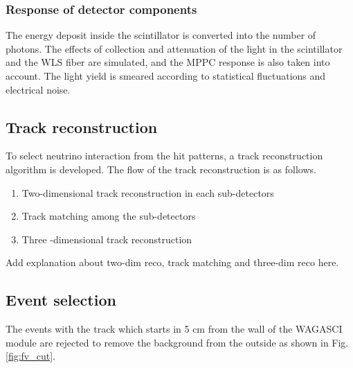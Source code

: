 \subsubsection{Response of detector components}
The energy deposit inside the scintillator is converted into the number of photons. 
The effects of collection and attenuation of the light in the scintillator and the WLS fiber are simulated, and the MPPC response is also taken into account. 
The light yield is smeared according to statistical fluctuations and electrical noise.


\subsection{Track reconstruction}
To select neutrino interaction from the hit patterns, a track reconstruction algorithm is developed.
The flow of the track reconstruction is as follows.
\begin{enumerate}
\item Two-dimensional track reconstruction in each sub-detectors
\item Track matching among the sub-detectors
\item Three -dimensional track reconstruction
\end{enumerate}

Add explanation about two-dim reco, track matching and three-dim reco here.


\subsection{Event selection}


The events with the track which starts in 5 cm from the wall of the WAGASCI module are rejected to remove the background from the outside as shown in Fig. \ref{fig:fv_cut}.

